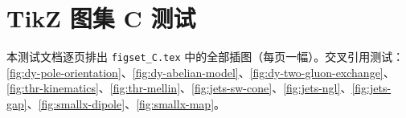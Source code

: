 

\chapter{TikZ 图集 C 测试}
本测试文档逐页排出 \texttt{figset\_C.tex} 中的全部插图（每页一幅）。交叉引用测试：\cref{fig:dy-pole-orientation}、\cref{fig:dy-abelian-model}、\cref{fig:dy-two-gluon-exchange}、\cref{fig:thr-kinematics}、\cref{fig:thr-mellin}、\cref{fig:jets-sw-cone}、\cref{fig:jets-ngl}、\cref{fig:jets-gap}、\cref{fig:smallx-dipole}、\cref{fig:smallx-map}。
\clearpage
\clearpage
\clearpage
\clearpage
\clearpage
\clearpage
\clearpage
\clearpage
\clearpage
\clearpage
\clearpage
